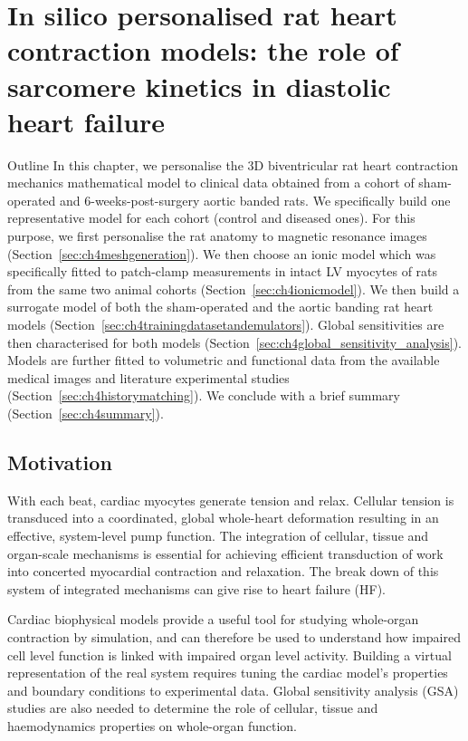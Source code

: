 \chapter{In silico personalised rat heart contraction models: the role of sarcomere kinetics in diastolic heart failure}\label{cha:chapter4}
%
%
%
\begin{remark}{Outline}
    In this chapter, we personalise the $3$D biventricular rat heart contraction mechanics mathematical model to clinical data obtained from a cohort of sham-operated and $6$-weeks-post-surgery aortic banded rats. We specifically build one representative model for each cohort (control and diseased ones). For this purpose, we first personalise the rat anatomy to magnetic resonance images (Section~\ref{sec:ch4meshgeneration}). We then choose an ionic model which was specifically fitted to patch-clamp measurements in intact LV myocytes of rats from the same two animal cohorts (Section~\ref{sec:ch4ionicmodel}). We then build a surrogate model of both the sham-operated and the aortic banding rat heart models (Section~\ref{sec:ch4trainingdatasetandemulators}). Global sensitivities are then characterised for both models (Section~\ref{sec:ch4global_sensitivity_analysis}). Models are further fitted to volumetric and functional data from the available medical images and literature experimental studies (Section~\ref{sec:ch4historymatching}). We conclude with a brief summary (Section~\ref{sec:ch4summary}).
\end{remark}


%
%
%
\section{Motivation}\label{sec:ch4motivation}
With each beat, cardiac myocytes generate tension and relax. Cellular tension is transduced into a coordinated, global whole-heart deformation resulting in an effective, system-level pump function. The integration of cellular, tissue and organ-scale mechanisms is essential for achieving efficient transduction of work into concerted myocardial contraction and relaxation. The break down of this system of integrated mechanisms can give rise to heart failure (HF). 

Cardiac biophysical models provide a useful tool for studying whole-organ contraction \cite{Niederer:2019} by simulation, and can therefore be used to understand how impaired cell level function is linked with impaired organ level activity. Building a virtual representation of the real system requires tuning the cardiac model's properties and boundary conditions to experimental data. Global sensitivity analysis (GSA) studies are also needed to determine the role of cellular, tissue and haemodynamics properties on whole-organ function.

